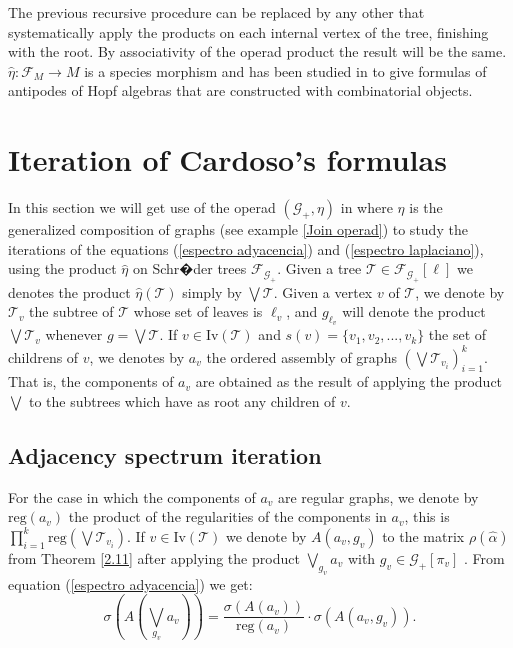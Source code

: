\documentclass[11pt]{article}
\theoremstyle{definition}
\begin{document}
The previous recursive procedure can be replaced by any other that systematically apply the products on each internal vertex of the tree, finishing with the root. By associativity of the operad product the result will be the same. $\widehat{\eta}:\mathscr{F}_M \longrightarrow M$ is a species morphism and has been studied in \cite{Miguel-Jean2014} to give formulas of antipodes of Hopf algebras that are constructed with combinatorial objects.

\section{Iteration of Cardoso's formulas}
In this section we will get use of the operad  $(\mathscr{G}_+, \eta)$ in where $\eta$ is the generalized composition of graphs (see example \ref{Join operad}) to study the iterations of the equations (\ref{espectro adyacencia}) and (\ref{espectro laplaciano}), using the product $\widehat{\eta}$ on Schr�der trees $\mathscr{F}_{\mathscr{G}_+}$. Given a tree $\mathscr{T} \in \mathscr{F}_{\mathscr{G}_+}[\ell]$ we denotes the product $\widehat{\eta}(\mathscr{T})$ simply by $\bigvee \mathscr{T}$. Given a vertex $v$ of $\mathscr{T}$, we denote by $\mathscr{T}_{v}$ the subtree of $\mathscr{T}$ whose set of leaves is $\ell_v$, and $g_{\ell_v}$ will denote the product $\bigvee \mathscr{T}_v$ whenever $g=\bigvee \mathscr{T}$. If $v\in \mathrm{Iv}(\mathscr{T})$ and $s(v)=\{v_1,v_2,...,v_k\}$ the set of childrens of $v$, we denotes by  $a_v$ the ordered assembly of graphs $\left(\bigvee \mathscr{T}_{v_i}\right)^{k}_{i=1}$. That is, the components of $a_v$ are obtained as the result of applying the product $\bigvee$ to the subtrees which have as root any children of $v$.

\subsection{Adjacency spectrum iteration}
For the case in which the components of $a_v$ are regular graphs, we denote by $\mathrm{reg}(a_v)$ the product of the regularities of the components in $a_v$, this is $\prod^k_{i=1}\mathrm{reg}\left(\bigvee \mathscr{T}_{v_i}\right)$. If $v\in \mathrm{Iv}(\mathscr{T})$ we denote by $A(a_v, g_v)$ to the matrix  $\rho(\widehat{\alpha})$ from Theorem \ref{2.11} after applying the product $\displaystyle{\bigvee_{g_v} a_v}$ with $g_v\in \mathscr{G}_+[\pi_v]$ . From equation (\ref{espectro adyacencia}) we get:
\begin{equation}\label{espectro adyacencia Join arbol}
\sigma\left(A\left(\bigvee_{g_v} a_v\right)\right)=\dfrac{\sigma(A(a_v))}{\mathrm{reg}(a_v)}\cdot \sigma(A(a_v, g_v)).
\end{equation}
\end{document}
